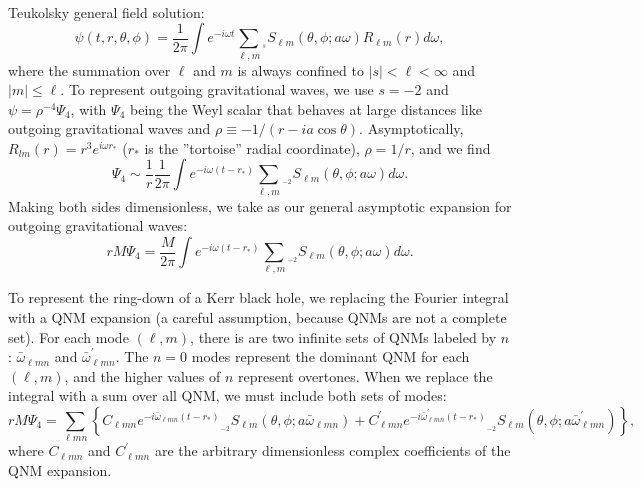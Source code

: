 \documentclass[11pt]{article}
\newcommand{\swSH}[5][]{{}_{{}_{#2}}S^{#1}_{#3}(#4;#5)}
\begin{document}
 \\

\noindent
Teukolsky general field solution:
\begin{equation}
\psi(t,r,\theta,\phi) = \frac{1}{2\pi} \int {e^{-i\omega t} \sum_{\ell,m} \swSH{s}{\ell{m}}{\theta,\phi}{a\omega}R_{\ell{m}}(r) d\omega },
\end{equation}
where the summation over $\ell$ and $m$ is always confined to $|s|<
\ell < \infty$ and $|m| \leq \ell$. To represent outgoing
gravitational waves, we use $s=-2$ and $\psi = \rho^{-4}\Psi_4$, with
$\Psi_4$ being the Weyl scalar that behaves at large distances like
outgoing gravitational waves and $\rho\equiv-1/(r-ia\cos\theta)$.
Asymptotically, $R_{lm}(r)=r^3e^{i\omega r_*}$ ($r_*$ is the
''tortoise'' radial coordinate), $\rho=1/r$, and we find
\begin{equation}
\Psi_4 \sim \frac1{r}\frac{1}{2\pi} \int {e^{-i\omega (t-r_*)} \sum_{\ell,m} \swSH{\minus 2}{\ell{m}}{\theta,\phi}{a\omega} d\omega }.
\end{equation}
Making both sides dimensionless, we take as our general asymptotic expansion for outgoing gravitational waves:
\begin{equation}
rM\Psi_4 = \frac{M}{2\pi} \int {e^{-i\omega (t-r_*)} \sum_{\ell,m} \swSH{\minus 2}{\ell{m}}{\theta,\phi}{a\omega} d\omega }.
\end{equation}

To represent the ring-down of a Kerr black hole, we replacing the
Fourier integral with a QNM expansion (a careful assumption, because
QNMs are not a complete set).  For each mode $(\ell,m)$, there is are
two infinite sets of QNMs labeled by $n$: $\bar\omega_{\ell{m}n}$ and
$\bar\omega^\prime_{\ell{m}n}$.  The $n=0$ modes represent the
dominant QNM for each $(\ell,m)$, and the higher values of $n$
represent overtones.  When we replace the integral with a sum over all QNM, we must include both sets of modes:
\begin{equation}
rM\Psi_4 = \sum_{\ell{m}n}\left\{C_{\ell{m}n}e^{-i\bar\omega_{\ell{m}n} (t-r_*)}
           \swSH{\minus 2}{\ell{m}}{\theta,\phi}{a\bar\omega_{\ell{m}n}} 
           + C^\prime_{\ell{m}n}e^{-i\bar\omega^\prime_{\ell{m}n} (t-r_*)}
           \swSH{\minus 2}{\ell{m}}{\theta,\phi}{a\bar\omega^\prime_{\ell{m}n}}
           \right\}, 
\end{equation}
where $C_{\ell{m}n}$ and $C^\prime_{\ell{m}n}$ are the arbitrary
dimensionless complex coefficients of the QNM expansion.
\end{document}
